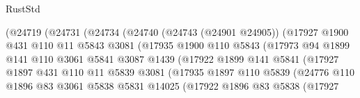 \begin{lexlean}{RustStd}
\begin{coremodule}
                            (@24719
                              (@24731
                                (@24734
                                  (@24740
                                    (@24743 (@24901 @24905))
                                    (@17927
                                      @1900
                                      @431
                                      @110
                                      @11
                                      @5843
                                      @3081
                                      (@17935
                                        @1900
                                        @110
                                        @5843
                                        (@17973
                                          @94
                                          @1899
                                          @141
                                          @110
                                          @3061
                                          @5841
                                          @3087
                                          @1439
                                          (@17922
                                            @1899
                                            @141
                                            @5841
                                            (@17927
                                              @1897
                                              @431
                                              @110
                                              @11
                                              @5839
                                              @3081
                                              (@17935
                                                @1897
                                                @110
                                                @5839
                                                (@24776
                                                  @110
                                                  @1896
                                                  @83
                                                  @3061
                                                  @5838
                                                  @5831
                                                  @14025
                                                  (@17922
                                                    @1896
                                                    @83
                                                    @5838
                                                    (@17927

\end{coremodule}
\end{lexlean}
